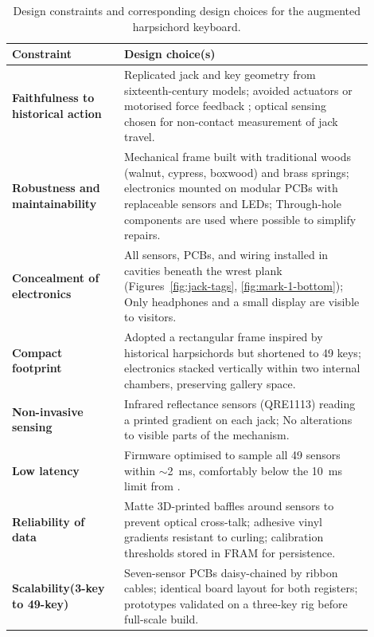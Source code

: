 \begin{table}
\centering
\caption[Design choices]{Design constraints and corresponding design choices for the augmented harpsichord keyboard.}
\label{tab:constraints-choices}
\begin{tabular}{>{\raggedright\arraybackslash}p{0.28\linewidth} p{0.62\linewidth}}
\toprule
\textbf{Constraint} & \textbf{Design choice(s)} \\
\midrule
\textbf{Faithfulness to historical action} & 
Replicated jack and key geometry from sixteenth-century models;  
avoided actuators or motorised force feedback \cite{gillespie_haptic_1996,timmermans_multibody-based_2020};  optical sensing chosen for non-contact measurement of jack travel. \\[0.8ex]

\textbf{Robustness and maintainability} &
Mechanical frame built with traditional woods (walnut, cypress, boxwood) and brass springs;  
electronics mounted on modular PCBs with replaceable sensors and LEDs;  
Through-hole components are used where possible to simplify repairs. \\[0.8ex]

\textbf{Concealment of electronics} &
All sensors, PCBs, and wiring installed in cavities beneath the wrest plank (Figures~\ref{fig:jack-tags}, \ref{fig:mark-1-bottom});  
Only headphones and a small display are visible to visitors. \\[0.8ex]

\textbf{Compact footprint} &
Adopted a rectangular frame inspired by historical harpsichords but shortened to 49 keys;  
electronics stacked vertically within two internal chambers, preserving gallery space. \\[0.8ex]

\textbf{Non-invasive sensing} &
Infrared reflectance sensors (QRE1113) reading a printed gradient on each jack;  No alterations to visible parts of the mechanism. \\[0.8ex]

\textbf{Low latency} &
Firmware optimised to sample all 49 sensors within \(\sim\)2~ms, comfortably below the 10~ms limit from \textcite{jack_effect_2016}. \\[0.8ex]

\textbf{Reliability of data} &
Matte 3D-printed baffles around sensors to prevent optical cross-talk;  
adhesive vinyl gradients resistant to curling;  
calibration thresholds stored in FRAM for persistence. \\[0.8ex]

\textbf{Scalability\newline(3-key to 49-key)} &
Seven-sensor PCBs daisy-chained by ribbon cables;  
identical board layout for both registers;  
prototypes validated on a three-key rig before full-scale build. \\
\bottomrule
\end{tabular}
\end{table}

